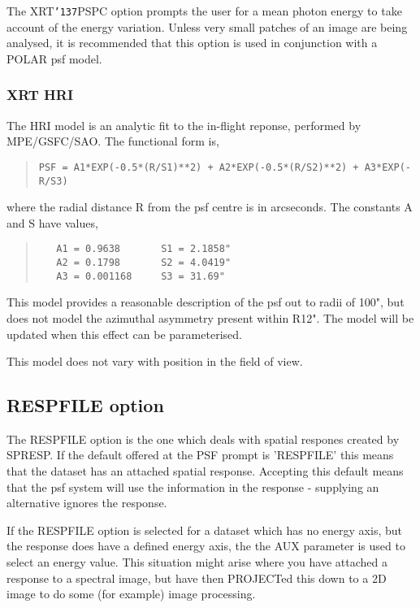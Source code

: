 \documentclass{book}
\renewcommand{\_}{{\tt\char'137}}     %
\begin{document}
The XRT\_PSPC option prompts the user for a mean photon energy
to take account of the energy variation. Unless very small
patches of an image are being analysed, it is recommended that
this option is used in conjunction with a POLAR psf model.

\subsubsection{XRT HRI}
The HRI model is an analytic fit to the in-flight reponse,
performed by MPE/GSFC/SAO. The functional form is,

\begin{quote}\begin{verbatim}
PSF = A1*EXP(-0.5*(R/S1)**2) + A2*EXP(-0.5*(R/S2)**2) + A3*EXP(-R/S3)
\end{verbatim}\end{quote}
where the radial distance R from the psf centre is in arcseconds.
The constants A and S have values,
\begin{quote}\begin{verbatim}
   A1 = 0.9638       S1 = 2.1858"
   A2 = 0.1798       S2 = 4.0419"
   A3 = 0.001168     S3 = 31.69"
\end{verbatim}\end{quote}
This model provides a reasonable description of the psf out to
radii of 100", but does not model the azimuthal asymmetry
present within R12". The model will be updated when this effect
can be parameterised.

This model does not vary with position in the field of view.

\subsection{RESPFILE option}
The RESPFILE option is the one which deals with spatial respones
created by SPRESP. If the default offered at the PSF prompt
is 'RESPFILE' this means that the dataset has an attached spatial
response. Accepting this default means that the psf system will
use the information in the response - supplying an alternative
ignores the response.

If the RESPFILE option is selected for a dataset which has no
energy axis, but the response does have a defined energy axis,
the the AUX parameter is used to select an energy value. This
situation might arise where you have attached a response to a
spectral image, but have then PROJECTed this down to a 2D
image to do some (for example) image processing.
\end{document}
